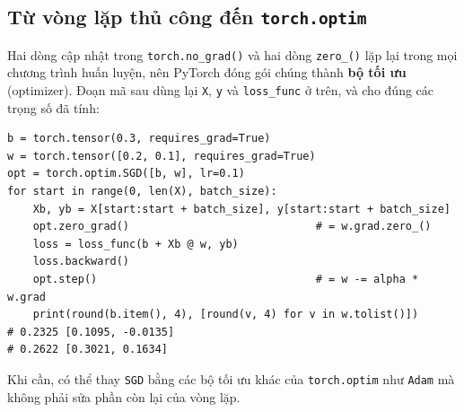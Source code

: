 \subsection{Từ vòng lặp thủ công đến \texttt{torch.optim}}

Hai dòng cập nhật trong \texttt{torch.no\_grad()} và hai dòng \texttt{zero\_()} lặp lại trong mọi chương trình huấn luyện, nên PyTorch đóng gói chúng thành \textbf{bộ tối ưu} (optimizer). Đoạn mã sau dùng lại \texttt{X}, \texttt{y} và \texttt{loss\_func} ở trên, và cho đúng các trọng số đã tính:

\begin{lstlisting}[caption={Thay phần cập nhật thủ công bằng torch.optim.SGD}]
b = torch.tensor(0.3, requires_grad=True)
w = torch.tensor([0.2, 0.1], requires_grad=True)
opt = torch.optim.SGD([b, w], lr=0.1)
for start in range(0, len(X), batch_size):
    Xb, yb = X[start:start + batch_size], y[start:start + batch_size]
    opt.zero_grad()                             # = w.grad.zero_()
    loss = loss_func(b + Xb @ w, yb)
    loss.backward()
    opt.step()                                  # = w -= alpha * w.grad
    print(round(b.item(), 4), [round(v, 4) for v in w.tolist()])
# 0.2325 [0.1095, -0.0135]
# 0.2622 [0.3021, 0.1634]
\end{lstlisting}

Khi cần, có thể thay \texttt{SGD} bằng các bộ tối ưu khác của \texttt{torch.optim} như \texttt{Adam} mà không phải sửa phần còn lại của vòng lặp.

